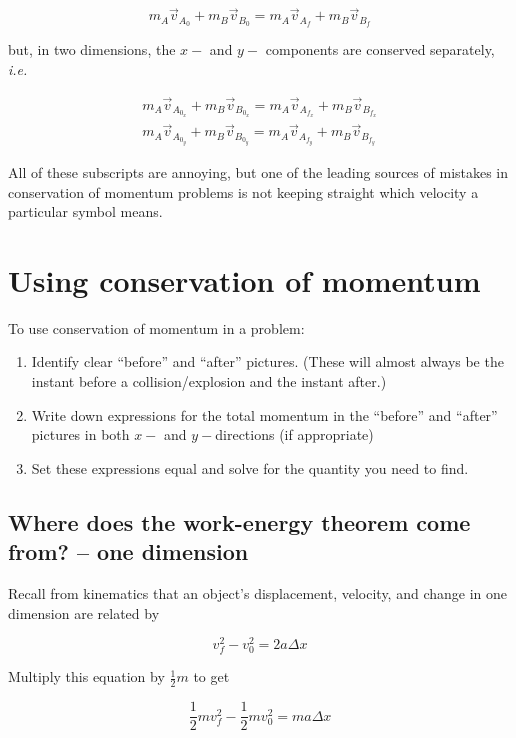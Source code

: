 \documentclass[10pt]{article}
\begin{document}
\begin{equation*}
m_A\vec v_{A_0} + m_B\vec v_{B_0} = m_A\vec v_{A_f} + m_B\vec v_{B_f}
\end{equation*}

but, in two dimensions, the $x-$ and $y-$ components are conserved separately, {\it i.e.}

\begin{align}
m_{A}\vec v_{A_{0_x}} + m_B\vec v_{B_{0_x}} = m_A\vec v_{A_{f_x}} + m_B\vec v_{B_{f_x}} \nonumber \\
m_{A}\vec v_{A_{0_y}} + m_B\vec v_{B_{0_y}} = m_A\vec v_{A_{f_y}} + m_B\vec v_{B_{f_y}}
\end{align}

All of these subscripts are annoying, but one of the leading sources of mistakes in conservation of momentum problems is not keeping straight which velocity a particular symbol means.

\section{Using conservation of momentum}

To use conservation of momentum in a problem:

\begin{enumerate}
	\item Identify clear ``before'' and ``after'' pictures. (These will almost always be the instant before a collision/explosion and the instant after.)
	\item Write down expressions for the total momentum in the ``before'' and ``after'' pictures in both $x-$ and $y-$directions (if appropriate)
	\item Set these expressions equal and solve for the quantity you need to find. 
\end{enumerate}


\subsection{Where does the work-energy theorem come from? -- one dimension}


Recall from kinematics that an object's displacement, velocity, and change in one dimension are related by 

$$ v_f^2 - v_0^2 = 2a\Delta x$$

Multiply this equation by $\frac{1}{2}m$ to get

$$ \frac{1}{2}mv_f^2 - \frac{1}{2}mv_0^2 = ma \Delta x$$
\end{document}
